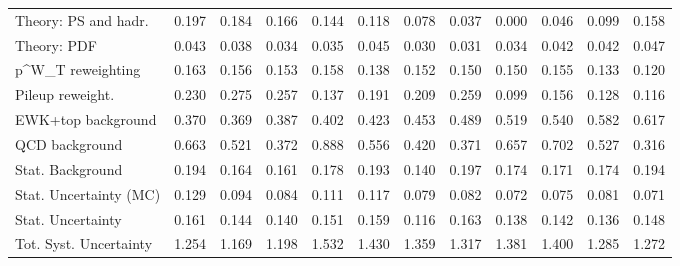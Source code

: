 \begin{tabular}{l|p{0.6cm}p{0.6cm}p{0.6cm}p{0.6cm}p{0.6cm}p{0.6cm}p{0.6cm}p{0.6cm}p{0.6cm}p{0.6cm}p{0.6cm}}
Theory: PS and hadr.                     & 0.197 & 0.184 & 0.166 & 0.144 & 0.118 & 0.078 & 0.037 & 0.000 & 0.046 & 0.099 & 0.158 \\
Theory: PDF                              & 0.043 & 0.038 & 0.034 & 0.035 & 0.045 & 0.030 & 0.031 & 0.034 & 0.042 & 0.042 & 0.047 \\
p^{W}_{T} reweighting                    & 0.163 & 0.156 & 0.153 & 0.158 & 0.138 & 0.152 & 0.150 & 0.150 & 0.155 & 0.133 & 0.120 \\
Pileup reweight.                         & 0.230 & 0.275 & 0.257 & 0.137 & 0.191 & 0.209 & 0.259 & 0.099 & 0.156 & 0.128 & 0.116 \\
EWK+top background                       & 0.370 & 0.369 & 0.387 & 0.402 & 0.423 & 0.453 & 0.489 & 0.519 & 0.540 & 0.582 & 0.617 \\
QCD background                           & 0.663 & 0.521 & 0.372 & 0.888 & 0.556 & 0.420 & 0.371 & 0.657 & 0.702 & 0.527 & 0.316 \\
Stat. Background                         & 0.194 & 0.164 & 0.161 & 0.178 & 0.193 & 0.140 & 0.197 & 0.174 & 0.171 & 0.174 & 0.194 \\
Stat. Uncertainty (MC)                   & 0.129 & 0.094 & 0.084 & 0.111 & 0.117 & 0.079 & 0.082 & 0.072 & 0.075 & 0.081 & 0.071 \\
\hline
Stat. Uncertainty                        & 0.161 & 0.144 & 0.140 & 0.151 & 0.159 & 0.116 & 0.163 & 0.138 & 0.142 & 0.136 & 0.148 \\
\hline
Tot. Syst. Uncertainty                   & 1.254 & 1.169 & 1.198 & 1.532 & 1.430 & 1.359 & 1.317 & 1.381 & 1.400 & 1.285 & 1.272 \\
\hline
\end{tabular}
